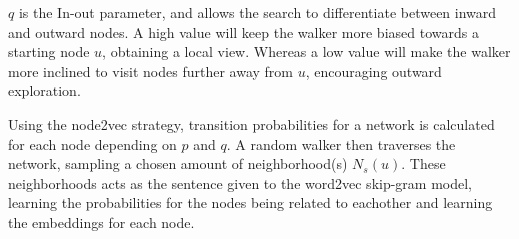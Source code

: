 $q$ is the In-out parameter, and allows the search to differentiate between inward and outward nodes. A high value will keep the walker more biased towards a starting node $u$, obtaining a local view. Whereas a low value will make the walker more inclined to visit nodes further away from $u$, encouraging outward exploration.

Using the node2vec strategy, transition probabilities for a network is calculated for each node depending on $p$ and $q$. A random walker then traverses the network, sampling a chosen amount of neighborhood(s) $N_s(u)$. These neighborhoods acts as the sentence given to the word2vec skip-gram model, learning the probabilities for the nodes being related to eachother and learning the embeddings for each node.
